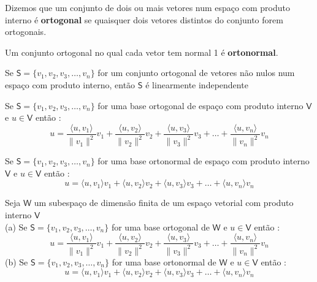 \documentclass[10pt,a4paper]{article}
\begin{document}
\begin{definition} Dizemos que um conjunto de dois ou mais vetores num espaço com produto interno é \textbf{ortogonal} se quaisquer dois vetores distintos do conjunto forem ortogonais.
\end{definition}

\begin{definition} Um conjunto ortogonal no qual cada vetor tem normal 1 é \textbf{ortonormal}.
\end{definition}

\begin{theorem} Se $\mathsf{S} = \{ v_1, v_2, v_3, \dots, v_n \}$ for um conjunto ortogonal de vetores não nulos num espaço com produto interno, então $\mathsf{S}$ é linearmente independente
\end{theorem}

\begin{theorem} Se $\mathsf{S} = \{ v_1, v_2, v_3, \dots, v_n \}$ for uma base ortogonal de espaço com produto interno $\mathsf{V}$ e $u \in \mathsf{V}$ então :
\[
	u = \frac{\langle u, v_1 \rangle}{\lVert v_1 \rVert ^ 2} v_1 + \frac{\langle u, v_2 \rangle}{\lVert v_2 \rVert ^ 2} v_2 + \frac{\langle u, v_3 \rangle}{\lVert v_3 \rVert ^ 2} v_3 + \dots + \frac{\langle u, v_n \rangle}{\lVert v_n \rVert ^ 2} v_n
\]
\end{theorem}

\begin{theorem} Se $\mathsf{S} = \{ v_1, v_2, v_3, \dots, v_n \}$ for uma base ortonormal de espaço com produto interno $\mathsf{V}$ e $u \in \mathsf{V}$ então :
\[
	u = \langle u, v_1 \rangle v_1 + \langle u, v_2 \rangle v_2 + \langle u, v_3 \rangle v_3 + \dots + \langle u, v_n \rangle v_n
\]
\end{theorem}

\begin{theorem} Seja $\mathsf{W}$ um subespaço de dimensão finita de um espaço vetorial com produto interno $\mathsf{V}$\\
(a) Se $\mathsf{S} = \{ v_1, v_2, v_3, \dots, v_n \}$ for uma base ortogonal de $\mathsf{W}$ e $u \in \mathsf{V}$ então :
\[
	u = \frac{\langle u, v_1 \rangle}{\lVert v_1 \rVert ^ 2} v_1 + \frac{\langle u, v_2 \rangle}{\lVert v_2 \rVert ^ 2} v_2 + \frac{\langle u, v_3 \rangle}{\lVert v_3 \rVert ^ 2} v_3 + \dots + \frac{\langle u, v_n \rangle}{\lVert v_n \rVert ^ 2} v_n
\]
(b) Se $\mathsf{S} = \{ v_1, v_2, v_3, \dots, v_n \}$ for uma base ortonormal de $\mathsf{W}$ e $u \in \mathsf{V}$ então :
\[
	u = \langle u, v_1 \rangle v_1 + \langle u, v_2 \rangle v_2 + \langle u, v_3 \rangle v_3 + \dots + \langle u, v_n \rangle v_n
\]
\end{theorem}
\end{document}
